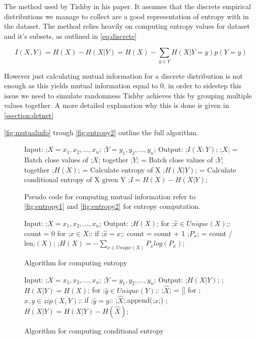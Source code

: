   The method used by Tishby in his paper. It assumes that the discrete empirical
  distributions we manage to collect are a good representation of entropy with
  in the dataset. The method relies heavily on computing entropy values for
  dataset and it's subsets, as outlined in \autoref{eq:discrete}

\begin{equation}
  I(X, Y) = H(X) - H(X|Y) = H(X) - \sum _{y\in Y} H(X|Y = y)p(Y = y)
\end{equation} \label{eq:discrete}


  However just calculating mutual information for a discrete distribution is not
  enough as this yields mutual information equal to 0, in order to sidestep this
  issue we need to simulate randomness Tishby achieves this by grouping multiple
  values together. A more detailed explanation why this is done is given in
  \autoref{ssection:detnet}

   \autoref{fig:mutualinfo} trough \autoref{fig:entropy2} outline the full
   algorithm.
\begin{figure}[H]
    \begin{pythonfigure}
      Input: 
      ;$X = x_1, x_2,...,x_n$;
      ;$Y = y_1, y_2,...,y_n$;
      Output: ;$I(X:Y)$;
      ;$X$; = Batch close values of ;$X$; together
      ;$Y$; = Batch close values of ;$Y$; together
      ;$H(X)$; = Calculate entropy of X
      ;$H(X|Y)$; = Calculate conditional entropy of X given Y
      ;$I = H(X) - H(X|Y)$;
    \end{pythonfigure}
    \caption{Pseudo code for computing mutual information refer to
    \autoref{fig:entropy1} and \autoref{fig:entropy2} for entropy computation.}
    \label{fig:mutualinfo}
\end{figure}

\begin{figure}[H]
    \begin{pythonfigure}
      Input: ;$X = x_1, x_2,...,x_n$;
      Output: ;$H(X)$;
      for ;$ \hat{x}\in Unique(X)$;:
        count = 0       
        for ;$x \in X$;:
          if ;$\hat{x} = x$;:
            count = count + 1
        ;$P_x$; = count / len;$(X)$;
      ;$H(X) = - \sum _{x\in Unique(X)} P_x log(P_x)$; 
    \end{pythonfigure}
    \caption{Algorithm for computing entropy}
    \label{fig:entropy1}
\end{figure} 

\begin{figure}[H]
    \begin{pythonfigure}
      Input: 
      ;$X = x_1, x_2,...,x_n$;
      ;$Y = y_1, y_2,...,y_n$;
      Output: ;$H(X|Y)$;
      ;$H(X|Y) = H(X)$;
      for ;$ \hat{y}\in Unique(Y)$;:
        ;$\hat{X}$; = []
        for ;$x, y \in zip(X, Y)$;:
          if ;$\hat{y} = y$;:
            ;$\hat{X}$;.append(;$x$;)
          ;$H(X|Y) = H(X|Y) - H(\hat{X})$;
    \end{pythonfigure}
    \caption{Algorithm for computing conditional entropy}
    \label{fig:entropy2}
\end{figure}


